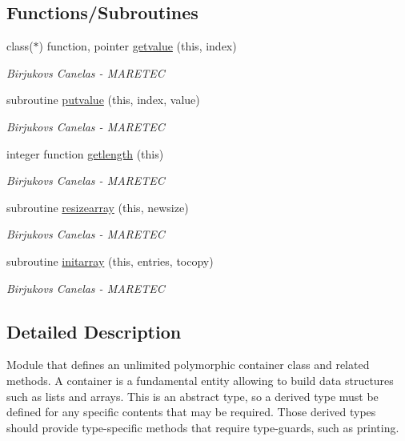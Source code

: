 \subsection*{Functions/\+Subroutines}
\begin{DoxyCompactItemize}
\item 
class($\ast$) function, pointer \hyperlink{namespaceabstract__container__array__mod_a2b3e0aec504d76c73bf7f18158924af4}{getvalue} (this, index)
\begin{DoxyCompactList}\small\item\em Birjukovs Canelas -\/ M\+A\+R\+E\+T\+EC \end{DoxyCompactList}\item 
subroutine \hyperlink{namespaceabstract__container__array__mod_aae1f6309c51e282a528ce78f128443e0}{putvalue} (this, index, value)
\begin{DoxyCompactList}\small\item\em Birjukovs Canelas -\/ M\+A\+R\+E\+T\+EC \end{DoxyCompactList}\item 
integer function \hyperlink{namespaceabstract__container__array__mod_a22d71ca3f03bf0bb5d3737338e5e349a}{getlength} (this)
\begin{DoxyCompactList}\small\item\em Birjukovs Canelas -\/ M\+A\+R\+E\+T\+EC \end{DoxyCompactList}\item 
subroutine \hyperlink{namespaceabstract__container__array__mod_ac2d73eb111ffde938f81e3f93b0cb3e0}{resizearray} (this, newsize)
\begin{DoxyCompactList}\small\item\em Birjukovs Canelas -\/ M\+A\+R\+E\+T\+EC \end{DoxyCompactList}\item 
subroutine \hyperlink{namespaceabstract__container__array__mod_a6a8e7af177f333262aba941775d6c245}{initarray} (this, entries, tocopy)
\begin{DoxyCompactList}\small\item\em Birjukovs Canelas -\/ M\+A\+R\+E\+T\+EC \end{DoxyCompactList}\end{DoxyCompactItemize}


\subsection{Detailed Description}
Module that defines an unlimited polymorphic container class and related methods. A container is a fundamental entity allowing to build data structures such as lists and arrays. This is an abstract type, so a derived type must be defined for any specific contents that may be required. Those derived types should provide type-\/specific methods that require type-\/guards, such as printing. 

